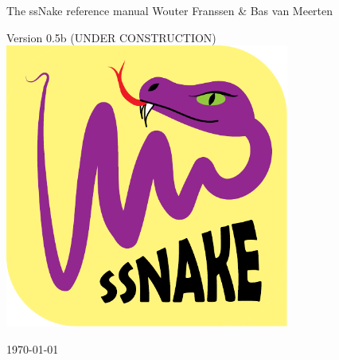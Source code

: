 %
%
%
%

\begin{titlepage}
\begin{center}




{\Huge The ssNake reference manual}
\vfill
\large Wouter Franssen \& Bas van Meerten

\vspace{1cm}
\large Version 0.5b (UNDER CONSTRUCTION)
\vfill
\includegraphics[width=0.7\textwidth]{Images/logo.pdf}\

\vfill
\vfill
{\large \today}

\end{center}

\end{titlepage}